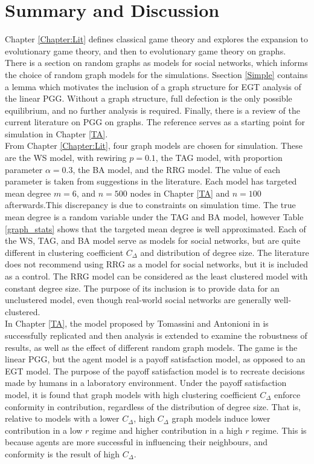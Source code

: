 \section{Summary and Discussion} 
Chapter \ref{Chapter:Lit} defines classical game theory and explores the expansion to evolutionary game theory, and then to evolutionary game theory on graphs. There is a section on random graphs as models for social networks, which informs the choice of random graph models for the simulations. Ssection \ref{Simple} contains a lemma which motivates the inclusion of a graph structure for EGT analysis of the linear PGG. Without a graph structure, full defection is the only possible equilibrium, and no further analysis is required. Finally, there is a review of the current literature on PGG on graphs. The reference \cite{RN49} serves as a starting point for simulation in Chapter \ref{TA}. \\

From Chapter \ref{Chapter:Lit}, four graph models are chosen for simulation. These are the WS model, with rewiring $p=0.1$, the TAG model, with proportion parameter $\alpha=0.3$, the BA model, and the RRG model. The value of each parameter is taken from suggestions in the literature. Each model has targeted mean degree $m=6$, and $n=500$ nodes in Chapter \ref{TA} and $n=100$ afterwards.This discrepancy is due to constraints on simulation time. The true mean degree is a random variable under the TAG and BA model, however Table \ref{graph_stats} shows that the targeted mean degree is well approximated. Each of the WS, TAG, and BA model serve as models for social networks, but are quite different in clustering coefficient $C_\Delta$ and distribution of degree size. The literature does not recommend using RRG as a model for social networks, but it is included as a control. The RRG model can be considered as the least clustered model with constant degree size. The purpose of its inclusion is to provide data for an unclustered model, even though real-world social networks are generally well-clustered. \\


In Chapter \ref{TA}, the model proposed by Tomassini and Antonioni in \cite{RN49} is successfully replicated and then analysis is extended to examine the robustness of results, as well as the effect of different random graph models. The game is the linear PGG, but the agent model is a payoff satisfaction model, as opposed to an EGT model. The purpose of the payoff satisfaction model is to recreate decisions made by humans in a laboratory environment. Under the payoff satisfaction model, it is found that graph models with high clustering coefficient $C_\Delta$ enforce conformity in contribution, regardless of the distribution of degree size. That is, relative to models with a lower $C_\Delta$, high $C_\Delta$ graph models induce lower contribution in a low $r$ regime and higher contribution in a high $r$ regime. This is because agents are more successful in influencing their neighbours, and conformity is the result of high $C_\Delta$. \\

